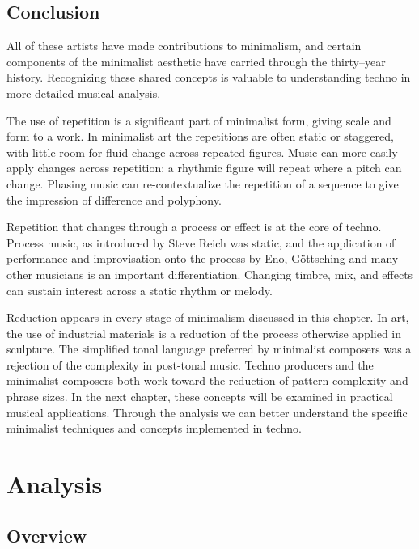 \documentclass[12pt,twoside]{reedthesis}
\begin{document}
\section{Conclusion}

All of these artists have made contributions to minimalism, and certain components of the minimalist aesthetic have carried through the thirty--year history. Recognizing these shared concepts is valuable to understanding techno in more detailed musical analysis. 

The use of repetition is a significant part of minimalist form, giving scale and form to a work. In minimalist art the repetitions are often static or staggered, with little room for fluid change across repeated figures. Music can more easily apply changes across repetition: a rhythmic figure will repeat where a pitch can change. Phasing music can re-contextualize the repetition of a sequence to give the impression of difference and polyphony.

Repetition that changes through a process or effect is at the core of techno. Process music, as introduced by Steve Reich was static, and the application of performance and improvisation onto the process by Eno, G{\"o}ttsching and many other musicians is an important differentiation. Changing timbre, mix, and effects can sustain interest across a static rhythm or melody.

Reduction appears in every stage of minimalism discussed in this chapter. In art, the use of industrial materials is a reduction of the process otherwise applied in sculpture. The simplified tonal language preferred by minimalist composers was a rejection of the complexity in post-tonal music. Techno producers and the minimalist composers both work toward the reduction of pattern complexity and phrase sizes. In the next chapter, these concepts will be examined in practical musical applications. Through the analysis we can better understand the specific minimalist techniques and concepts implemented in techno.

\chapter{Analysis}

\section{Overview}
\end{document}
